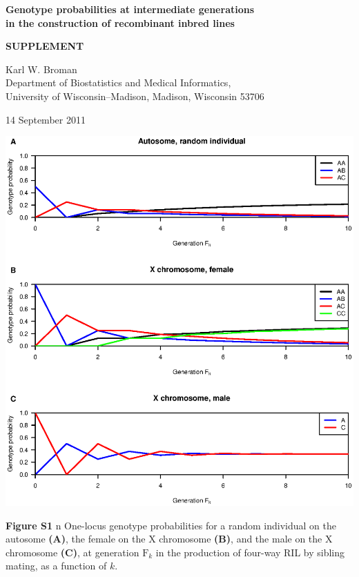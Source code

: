 \documentclass[9pt,letterpaper,twoside]{article}
\begin{document}
\thispagestyle{empty}


\vspace*{8mm}
\begin{center}

\textbf{\Large Genotype probabilities at intermediate generations\\[18pt]
in the construction of recombinant inbred lines}
 
\bigskip \bigskip
 
\bigskip \bigskip
 
\textbf{\Large SUPPLEMENT}

\bigskip \bigskip
\bigskip \bigskip
 
 
{\large Karl W. Broman\\[12pt]
Department of Biostatistics and Medical Informatics, \\[12pt]
University of Wisconsin--Madison, Madison, Wisconsin 53706 }
\end{center}


\vfill

\hfill 
{\footnotesize 14 September 2011}

\newpage

{
\centering
\includegraphics[width=\textwidth]{Figs/onelocus_fig.eps}

\bigskip
\textbf{Figure S1} {\color{white} n} One-locus genotype probabilities for 
a random individual on the autosome \textbf{(A)},  the female on the X
chromosome \textbf{(B)}, and the male on the X chromosome \textbf{(C)}, at
generation $\text{F}_k$ in the production of four-way RIL by sibling
mating, as a function of $k$.
}
\end{document}
